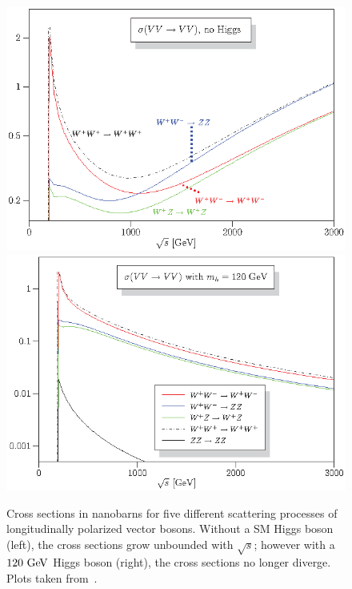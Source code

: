 \begin{figure}[htbp]
  \centering
  \includegraphics[height=.25\textheight]{figs/ssww_13tev/introduction/vbs_xsec_nohiggs}
  \includegraphics[height=.25\textheight]{figs/ssww_13tev/introduction/vbs_xsec_higgs120}
 
  \caption[Cross sections in nanobarns for five different scattering processes of longitudinally polarized vector bosons.  Without a SM Higgs boson (left), the cross sections grow unbounded with $\sqrt{s}$; however with a $120\gev$ Higgs boson (right), the cross sections no longer diverge.]{Cross sections in nanobarns for five different scattering processes of longitudinally polarized vector bosons.  Without a SM Higgs boson (left), the cross sections grow unbounded with $\sqrt{s}$; however with a $120\gev$ Higgs boson (right), the cross sections no longer diverge.  Plots taken from~\cite{2008.vbs-resonances-unitarity}.}
  \label{fig:ssww13tev_vbs_xsec_higgs}
\end{figure}

